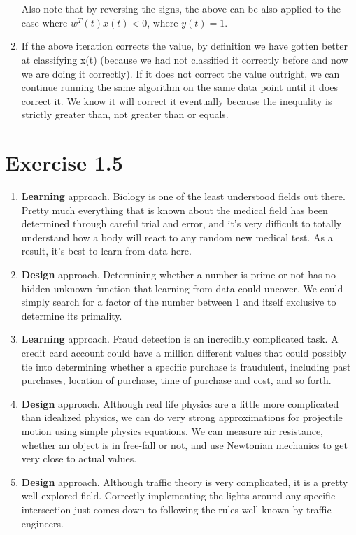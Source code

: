 \documentclass[12pt]{article}
\begin{document}
\begin{enumerate}[label=(\alph*)]
	\\ \\ Also note that by reversing the signs, the above can be also applied to the case where $w^T(t) x(t) < 0$, where $y(t) = 1$.
	\item If the above iteration corrects the value, by definition we have gotten better at classifying x(t) (because we had not classified it correctly before and now we are doing it correctly). If it does not correct the value outright, we can continue running the same algorithm on the same data point until it does correct it. We know it will correct it eventually because the inequality is strictly greater than, not greater than or equals.
\end{enumerate}

\section*{Exercise 1.5}
\begin{enumerate}[label=(\alph*)]
	\item \textbf{Learning} approach. Biology is one of the least understood fields out there. Pretty much everything that is known about the medical field has been determined through careful trial and error, and it's very difficult to totally understand how a body will react to any random new medical test. As a result, it's best to learn from data here.
	\item \textbf{Design} approach. Determining whether a number is prime or not has no hidden unknown function that learning from data could uncover. We could simply search for a factor of the number between 1 and itself exclusive to determine its primality.
	\item \textbf{Learning} approach. Fraud detection is an incredibly complicated task. A credit card account could have a million different values that could possibly tie into determining whether a specific purchase is fraudulent, including past purchases, location of purchase, time of purchase and cost, and so forth.
	\item \textbf{Design} approach. Although real life physics are a little more complicated than idealized physics, we can do very strong approximations for projectile motion using simple physics equations. We can measure air resistance, whether an object is in free-fall or not, and use Newtonian mechanics to get very close to actual values.
	\item \textbf{Design} approach. Although traffic theory is very complicated, it is a pretty well explored field. Correctly implementing the lights around any specific intersection just comes down to following the rules well-known by traffic engineers.
\end{enumerate}
\end{document}
